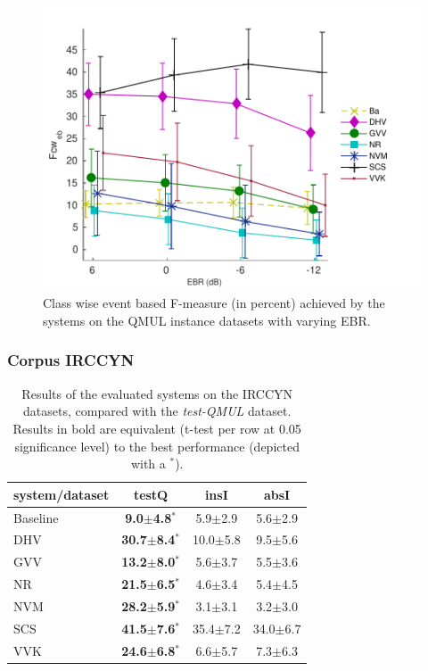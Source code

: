 \begin{figure}[t]
\begin{center}
\includegraphics[width=1\textwidth]{gfx/ch_7/ebr}
\caption{Class wise event based F-measure (in percent) achieved by the systems on the QMUL instance datasets with varying EBR.}
\label{fig:ebr} 
\end{center}
\end{figure}

\subsubsection{Corpus IRCCYN}

\begin{table}
\begin{center} 
\begin{tabular}{lccc}
system/dataset & testQ & insI & absI \\ 
\hline 
Baseline & \textbf{9.0$\pm$4.8$^*$}  &  5.9$\pm$2.9 &  5.6$\pm$2.9 \\ 
DHV      & \textbf{30.7$\pm$8.4$^*$} & 10.0$\pm$5.8 &  9.5$\pm$5.6 \\ 
GVV      & \textbf{13.2$\pm$8.0$^*$} &  5.6$\pm$3.7 &  5.5$\pm$3.6 \\
NR       & \textbf{21.5$\pm$6.5$^*$} &  4.6$\pm$3.4 &  5.4$\pm$4.5 \\ 
NVM      & \textbf{28.2$\pm$5.9$^*$} &  3.1$\pm$3.1 &  3.2$\pm$3.0 \\ 
SCS      & \textbf{41.5$\pm$7.6$^*$} & 35.4$\pm$7.2 & 34.0$\pm$6.7 \\ 
VVK      & \textbf{24.6$\pm$6.8$^*$} &  6.6$\pm$5.7 &  7.3$\pm$6.3 \\ 
\hline
\end{tabular} 
\end{center}  
\caption{Results of the evaluated systems on the IRCCYN datasets, compared with the \emph{test-QMUL} dataset. Results in bold are equivalent (t-test per row at 0.05 significance level) to the best performance (depicted with a $^*$).}
\label{tab:irccyn} 
\end{table} 

